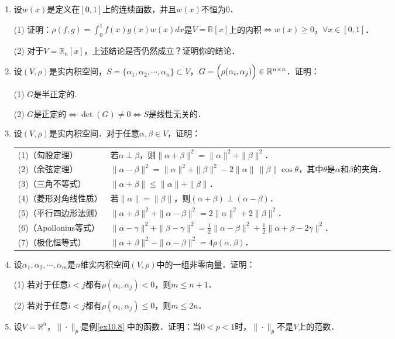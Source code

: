 \documentclass[a4paper,fontset=windows]{ctexbook}
\theoremstyle{definition}
\renewcommand{\le}{\leqslant}
\renewcommand{\ge}{\geqslant}
\begin{document}
\begin{enumerate}
\item 设$w(x)$是定义在$[0,1]$上的连续函数，并且$w(x)$不恒为0．

(1) 证明：$\rho(f,g)=\int_0^1f(x)g(x)w(x)dx$是$V=\mathbb{R}[x]$上的内积$\Leftrightarrow w(x)\ge 0$，$\forall x\in[0,1]$．

(2) 对于$V=\mathbb{R}_n[x]$，上述结论是否仍然成立？证明你的结论．

\item 设$(V,\rho)$是实内积空间，$S=\{\alpha_1,\alpha_2,\cdots,\alpha_n\}\subset V$，$G=\Bigl(\rho(\alpha_i,\alpha_j)\Bigr)\in\mathbb{R}^{n\times n}$．证明：

(1) $G$是半正定的.

(2) $G$是正定的$\Leftrightarrow\det(G)\ne 0\Leftrightarrow S$是线性无关的．

\item 设$(V,\rho)$是实内积空间．对于任意$\alpha,\beta\in V$，证明：

\hspace*{-6pt}\begin{tabular}{ll}
(1)（勾股定理）& 若$\alpha\perp\beta$，则$\|\alpha+\beta\|^2=\|\alpha\|^2+\|\beta\|^2$．\\
(2)（余弦定理）& $\|\alpha-\beta\|^2=\|\alpha\|^2+\|\beta\|^2-2\|\alpha\|\,\|\beta\|\cos\theta$，其中$\theta$是$\alpha$和$\beta$的夹角．\\
(3)（三角不等式）& $\|\alpha+\beta\|\le\|\alpha\|+\|\beta\|$．\\
(4)（菱形对角线性质）& 若$\|\alpha\|=\|\beta\|$，则$(\alpha+\beta)\perp(\alpha-\beta)$．\\
(5)（平行四边形法则）& $\|\alpha+\beta\|^2+\|\alpha-\beta\|^2=2\|\alpha\|^2+2\|\beta\|^2$．\\
(6)（Apollonius等式）& $\|\alpha-\gamma\|^2+\|\beta-\gamma\|^2=\frac{1}{2}\|\alpha-\beta\|^2+\frac{1}{2}\|\alpha+\beta-2\gamma\|^2$．\\
(7)（极化恒等式）& $\|\alpha+\beta\|^2-\|\alpha-\beta\|^2=4\rho(\alpha,\beta)$．
\end{tabular}

\item 设$\alpha_1,\alpha_2,\cdots,\alpha_m$是$n$维实内积空间$(V,\rho)$中的一组非零向量．证明：

(1) 若对于任意$i<j$都有$\rho(\alpha_i,\alpha_j)<0$，则$m\le n+1$．

(2) 若对于任意$i<j$都有$\rho(\alpha_i,\alpha_j)\le 0$，则$m\le 2n$．

\item 设$V=\mathbb{R}^n$，$\|\cdot\|_p$是例\ref{ex10.8} 中的函数．证明：当$0<p<1$时，$\|\cdot\|_p$不是$V$上的范数．

\end{enumerate}
\end{document}
